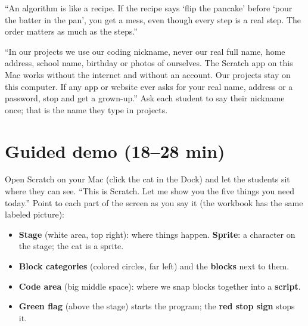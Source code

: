 \begin{analogy}
\enquote{An algorithm is like a recipe. If the recipe says \enquote{flip the pancake} before \enquote{pour the batter in the pan}, you get a mess, even though every step is a real step. The order matters as much as the steps.}
\end{analogy}

\begin{safety}
\enquote{In our projects we use our coding nickname, never our real full name, home address, school name, birthday or photos of ourselves. The Scratch app on this Mac works without the internet and without an account. Our projects stay on this computer. If any app or website ever asks for your real name, address or a password, stop and get a grown-up.} Ask each student to say their nickname once; that is the name they type in projects.
\end{safety}

\section{Guided demo (18--28 min)}
\begin{teacherscript}
Open Scratch on your Mac (click the cat in the Dock) and let the students sit where they can see. \enquote{This is Scratch. Let me show you the five things you need today.} Point to each part of the screen as you say it (the workbook has the same labeled picture):
\begin{itemize}[leftmargin=1.2em,itemsep=0pt]
  \item \textbf{Stage} (white area, top right): where things happen. \textbf{Sprite}: a character on the stage; the cat is a sprite.
  \item \textbf{Block categories} (colored circles, far left) and the \textbf{blocks} next to them.
  \item \textbf{Code area} (big middle space): where we snap blocks together into a \textbf{script}.
  \item \textbf{Green flag} (above the stage) starts the program; the \textbf{red stop sign} stops it.
\end{itemize}
\end{teacherscript}

